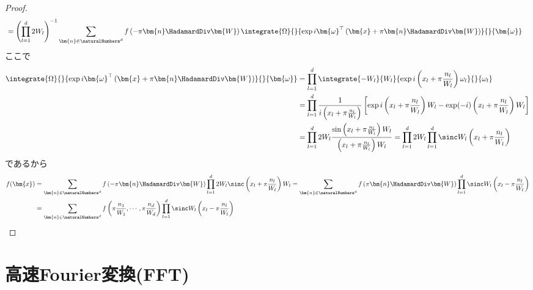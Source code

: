 \begin{proof}
\begin{align*}
					&= \left(\prod_{l=1}^d 2W_l\right)^{-1} \sum_{\bm{n}\in\naturalNumbers^d} f\left(-\pi\bm{n}\HadamardDiv\bm{W}\right) \integrate{\Omega}{}{\exp i \bm{\omega}^\top\left(\bm{x} + \pi\bm{n}\HadamardDiv\bm{W}\right) }{}{\bm{\omega}}
				\end{align*}
				ここで
				\begin{align*}
					\integrate{\Omega}{}{\exp i \bm{\omega}^\top\left(\bm{x} + \pi\bm{n}\HadamardDiv\bm{W}\right) }{}{\bm{\omega}} &= \prod_{l=1}^d \integrate{-W_l}{W_l}{\exp i\left(x_l + \pi\frac{n_l}{W_l}\right)\omega_l}{}{\omega_l} \\
					&= \prod_{l=1}^d \frac{1}{i\left(x_l + \pi\frac{n_l}{W_l}\right)}\left[\exp i\left(x_l + \pi\frac{n_l}{W_l}\right)W_l - \exp (-i)\left(x_l + \pi\frac{n_l}{W_l}\right)W_l\right] \\
					&= \prod_{l=1}^d 2W_l \frac{\sin \left(x_l + \pi\frac{n_l}{W_l}\right)W_l}{\left(x_l + \pi\frac{n_l}{W_l}\right)W_l} = \prod_{l=1}^d 2W_l \prod_{l=1}^d \sinc W_l\left(x_l + \pi\frac{n_l}{W_l}\right)
				\end{align*}
				であるから
				\begin{align*}
					f(\bm{x}) &= \sum_{\bm{n}\in\naturalNumbers^d} f\left(-\pi\bm{n}\HadamardDiv\bm{W}\right) \prod_{l=1}^d 2W_l \sinc \left(x_l + \pi\frac{n_l}{W_l}\right)W_l = \sum_{\bm{n}\in\naturalNumbers^d} f\left(\pi\bm{n}\HadamardDiv\bm{W}\right) \prod_{l=1}^d \sinc W_l\left(x_l - \pi\frac{n_l}{W_l}\right) \\
					&= \sum_{\bm{n}\in\naturalNumbers^d} f\left(\pi\frac{n_1}{W_1},\cdots,\pi\frac{n_d}{W_d}\right) \prod_{l=1}^d \sinc W_l\left(x_l - \pi\frac{n_l}{W_l}\right)
				\end{align*}
			\end{proof}
		\chapter{高速Fourier変換(FFT)}
